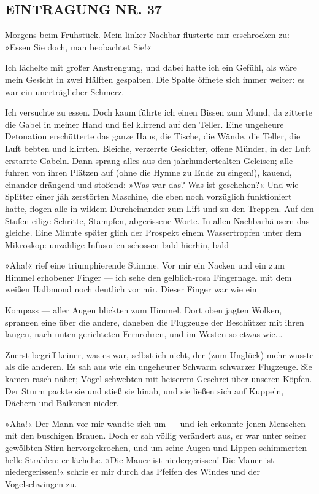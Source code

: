 \subsection{EINTRAGUNG NR. 37}

Morgens beim Frühstück. Mein linker Nachbar flüsterte mir
erschrocken zu: »Essen Sie doch, man beobachtet Sie!«

Ich lächelte mit großer Anstrengung, und dabei hatte ich ein
Gefühl, als wäre mein Gesicht in zwei Hälften gespalten. Die Spalte
öffnete sich immer weiter: es war ein unerträglicher Schmerz.

Ich versuchte zu essen. Doch kaum führte ich einen Bissen zum Mund,
da zitterte die Gabel in meiner Hand und fiel klirrend auf den
Teller. Eine ungeheure Detonation erschütterte das ganze Haus, die
Tische, die Wände, die Teller, die Luft bebten und klirrten.
Bleiche, verzerrte Gesichter, offene Münder, in der Luft erstarrte
Gabeln. Dann sprang alles aus den jahrhundertealten Geleisen; alle
fuhren von ihren Plätzen auf (ohne die Hymne zu Ende zu singen!),
kauend, einander drängend und stoßend: »Was war das? Was ist
geschehen?« Und wie Splitter einer jäh zerstörten Maschine, die
eben noch vorzüglich funktioniert hatte, flogen alle in wildem
Durcheinander zum Lift und zu den Treppen. Auf den Stufen eilige
Schritte, Stampfen, abgerissene Worte. In allen Nachbarhäusern das
gleiche. Eine Minute später glich der Prospekt einem Wassertropfen
unter dem Mikroskop: unzählige Infusorien schossen bald hierhin,
bald

»Aha!« rief eine triumphierende Stimme. Vor mir ein Nacken und ein
zum Himmel erhobener Finger — ich sehe den gelblich-rosa
Fingernagel mit dem weißen Halbmond noch deutlich vor mir. Dieser
Finger war wie ein

Kompass — aller Augen blickten zum Himmel. Dort oben jagten Wolken,
sprangen eine über die andere, daneben die Flugzeuge der Beschützer
mit ihren langen, nach unten gerichteten Fernrohren, und im Westen
so etwas wie...

Zuerst begriff keiner, was es war, selbst ich nicht, der (zum
Unglück) mehr wusste als die anderen. Es sah aus wie ein ungeheurer
Schwarm schwarzer Flugzeuge. Sie kamen rasch näher; Vögel schwebten
mit heiserem Geschrei über unseren Köpfen. Der Sturm packte sie und
stieß sie hinab, und sie ließen sich auf Kuppeln, Dächern und
Baikonen nieder.

»Aha!« Der Mann vor mir wandte sich um — und ich erkannte jenen
Menschen mit den buschigen Brauen. Doch er sah völlig verändert
aus, er war unter seiner gewölbten Stirn hervorgekrochen, und um
seine Augen und Lippen schimmerten helle Strahlen: er lächelte.
»Die Mauer ist niedergerissen! Die Mauer ist niedergerissen!«
schrie er mir durch das Pfeifen des Windes und der Vogelschwingen
zu.

